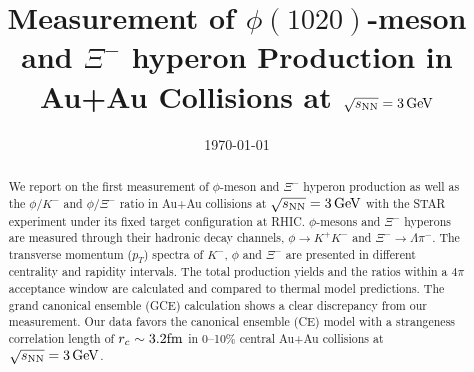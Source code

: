 \documentclass[%
 reprint,	
showpacs,
 amsmath,amssymb,
 aps,
 prc,
]{revtex4-1}
\begin{document}

\title{Measurement of $\phi(1020)$-meson and $\Xi^{-}$ hyperon Production in Au+Au Collisions at ${\sqrt{s_{\rm NN}} = \rm{3\,GeV}}$}%


\noaffiliation

\date{\today}%

\begin{abstract}


We report on the first measurement of $\phi$-meson and $\Xi^{-}$ hyperon production as well as the $\phi/K^-$ and $\phi/\Xi^-$ ratio in Au+Au collisions at ${\sqrt{s_{\rm NN}} = \rm{3\,GeV}}$ with the STAR experiment under its fixed target configuration at RHIC. $\phi$-mesons and $\Xi^{-}$ hyperons are measured through their hadronic decay channels, $\phi\rightarrow K^+K^-$ and $\Xi^-\rightarrow \Lambda\pi^-$. The transverse momentum ($p_T$) spectra of $K^-$, $\phi$ and $\Xi^{-}$ are presented in different centrality and rapidity intervals. The total production yields and the ratios within a $4\pi$ acceptance window are calculated and compared to thermal model predictions. The grand canonical ensemble (GCE) calculation shows a clear discrepancy from our measurement. Our data favors the canonical ensemble (CE) model with a strangeness correlation length of $r_c   \sim 3.2\rm{fm}$ in 0--10\% central Au+Au collisions at ${\sqrt{s_{\rm NN}} = \rm{3\,GeV}}$.


\end{abstract}
\end{document}

